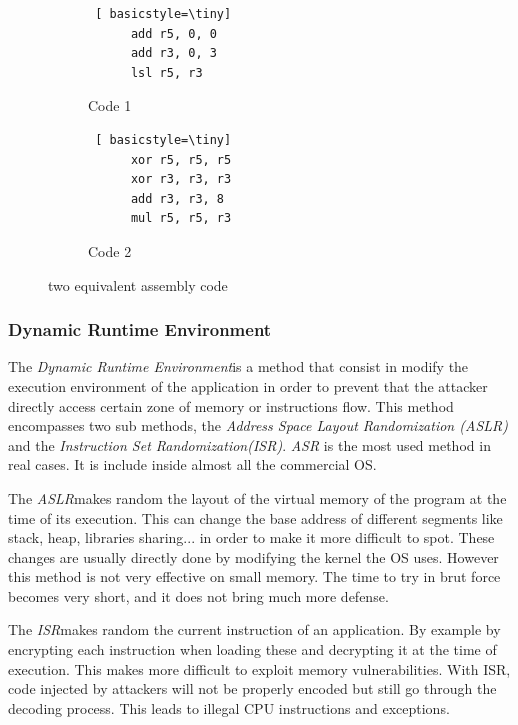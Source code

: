 \begin{figure}[h]
  \centering
  \begin{subfigure}{0.45\textwidth} %
    \centering
    \begin{lstlisting} [ basicstyle=\tiny]
      add r5, 0, 0
      add r3, 0, 3
      lsl r5, r3
    \end{lstlisting}
    \caption{Code 1}
  \end{subfigure}
  \hfill
  \begin{subfigure}{0.49\textwidth} %
    \centering
    \begin{lstlisting} [ basicstyle=\tiny]
      xor r5, r5, r5
      xor r3, r3, r3
      add r3, r3, 8
      mul r5, r5, r3
    \end{lstlisting}
    \caption{Code 2}
  \end{subfigure}
  \caption{two equivalent assembly code}
  \label{fig:dsoft}
\end{figure}


\subsubsection{ Dynamic Runtime Environment}


The \emph{Dynamic Runtime Environment}is a method that consist in modify
the execution environment of the application in order to prevent that the
attacker directly access certain zone of memory or instructions
flow. This method encompasses two sub methods, the \emph{Address Space
  Layout Randomization (ASLR)} and the \emph{Instruction Set Randomization(ISR)}. \emph{ASR}
is the most used method in real cases. It is include inside almost all
the commercial OS. 

The \emph{ASLR}makes random the layout of the virtual memory of the
program at the time of its execution. This can change the base
address of different segments like stack, heap, libraries
sharing... in order to make it more difficult to spot.
These changes are usually directly done by
modifying the kernel the OS uses.  \newline
However this method is not very effective on small
memory. The time to try in brut force becomes very short, and
it does not bring much more defense.

The \emph{ISR}makes random the current instruction of an application. By
example by encrypting each instruction when loading
these and decrypting it at the time of execution. This makes more
difficult to exploit memory vulnerabilities.
With ISR, code injected by attackers will not be properly encoded but
still go through the decoding process. This leads to illegal CPU
instructions and exceptions.

